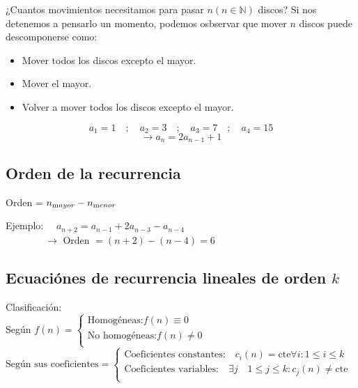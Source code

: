 ¿Cuantos movimientos necesitamos para pasar $n (n \in \mathbb{N})$ discos?
Si nos detenemos a pensarlo un momento, podemos osbservar que mover $n$ discos puede descomponerse como:

\begin{itemize}
	\item Mover todos los discos excepto el mayor.
	\item Mover el mayor.
	\item Volver a mover todos los discos excepto el mayor.
\end{itemize}

\begin{equation*}
	a_{1} = 1 \quad ; \quad a_{2} = 3 \quad ; \quad a_{3} = 7 \quad ; \quad a_{4} = 15
\end{equation*}
\begin{equation*}
	\rightarrow a_{n} = 2 a_{n-1} + 1
\end{equation*}

\subsection{Orden de la recurrencia}

Orden = $n_{\text mayor} - n_{\text menor}$


Ejemplo: $\quad a_{n+2} = a_{n-1} + 2 a_{n-3} - a_{n-4}$\\

$\quad \quad \quad \quad \rightarrow$ Orden $= (n+2) - (n-4) = 6$

\subsection{Ecuaciónes de recurrencia lineales de orden $k$}
Clasificación:\\

Según $f(n) = \left\{ \begin{array}{c}
\text{Homogéneas:} f(n) \equiv 0\\
\text{No homogéneas:} f(n) \neq 0\\
\end{array}\right.$\\

$\text{Según sus coeficientes} = \left\{ \begin{array}{c}
\text{Coeficientes constantes:} \quad c_{i}(n) = \text{cte} \forall i:1 \le i \le k\\
\text{Coeficientes variables:} \quad \exists j \quad 1 \le j \le k : c_{j}(n) \neq \text{cte}\\
\end{array}\right.$

